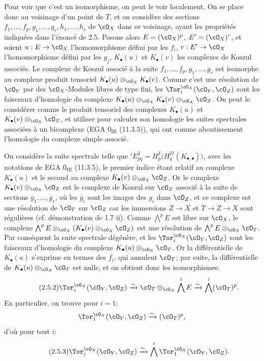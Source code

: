 Pour voir que c'est un isomorphisme, on peut le voir localement. On se place donc au voisinage d'un point de \(T\), et on considère des sections \(f_1,\ldots,f_p,g_1,\ldots,g_r,h_1,\ldots,h_s\) de \(\cO_X\) dans ce voisinage, ayant les propriétés indiquées dans l'énoncé de 2.5. Posons alors \(E=(\cO_X)^p\), \(E'=(\cO_X)^r\), et soient \(u:E\to\cO_X\) l'homomorphisme défini par les \(f_i\), \(v:E'\to\cO_X\) l'homomorphisme défini par les \(g_j\), \(K_\bullet(u)\) et \(K_\bullet(v)\) les
complexes de Koszul associés. Le complexe de Koszul associé à la suite \(f_1,\ldots,f_p,g_1,\ldots,g_r\) est isomorphe au complexe produit tensoriel \(K_\bullet(u)\otimes_{\cO_X}K_\bullet(v)\). Comme c'est une résolution de \(\cO_Y\) par des \(\cO_X\)-Modules libres de type fini, les \(\Tor_i^{\cO_X}(\cO_Y,\cO_Z)\) sont les faisceaux d'homologie du complexe \(K_\bullet(u)\otimes_{\cO_X}K_\bullet(v)\otimes_{\cO_X}\cO_Z\). On peut le considérer comme le produit tensoriel des complexes \(K_\bullet(u)\) et \(K_\bullet(v)\otimes_{\cO_X}\cO_Z\), et utiliser pour calculer son homologie les suites spectrales associées à un bicomplexe (EGA \(0_{\mathrm{III}}\) (11.3.5)), qui ont comme aboutissement l'homologie du complexe simple associé.

On considère la suite spectrale telle que \({}'E^2_{pq}=H^I_p\bigl(H^{II}_q(K_{\bullet,\bullet})\bigr)\), avec les notations de EGA \(0_{\mathrm{III}}\) (11.3.5), le premier indice étant relatif au complexe \(K_\bullet(u)\) et le second au complexe \(K_\bullet(v)\otimes_{\cO_X}\cO_Z\). Or le complexe \(K_\bullet(v)\otimes_{\cO_X}\cO_Z\) est le complexe de Koszul sur \(\cO_Z\) associé à la suite de sections \(\overline g_1,\ldots,\overline g_r\), où les \(\overline g_i\) sont les images des \(g_i\) dans \(\cO_Z\), et ce complexe est une résolution de \(\cO_T\) sur \(\cO_Z\) car les immersions \(Z\to X\) et \(T\to Z\to X\) sont régulières (cf. démonstration de 1.7 ii). Comme \(\bigwedge^p E\) est libre sur \(\cO_X\), le complexe \(\bigwedge^pE\otimes_{\cO_X}(K_\bullet(v)\otimes_{\cO_X}\cO_Z)\) est une résolution de \(\bigwedge^pE\otimes_{\cO_X}\cO_T\). Par conséquent la suite spectrale dégénère, et les \(\Tor_i^{\cO_X}(\cO_Y,\cO_Z)\) sont les faisceaux d'homologie du complexe \(K_\bullet(u)\otimes_{\cO_X}\cO_T\). Or la différentielle de \(K_\bullet(u)\) s'exprime en termes des \(f_i\), qui annulent \(\cO_T\); par suite, la différentielle de \(K_\bullet(u)\otimes_{\cO_X}\cO_T\) est nulle, et on obtient donc les isomorphismes:
\begin{equation}\tag{2.5.2}
\Tor_i^{\cO_X}(\cO_Y,\cO_Z)
\xrightarrow{\sim}
\cO_T\otimes_{\cO_X}\bigwedge^iE
\xrightarrow{\sim}
\bigwedge^i(\cO_T)^p.
\end{equation}
En particulier, on trouve pour \(i=1\):
\[
\Tor_1^{\cO_X}(\cO_Y,\cO_Z)\xrightarrow{\sim}(\cO_T)^p,
\]
d'où pour tout \(i\):
\begin{equation}\tag{2.5.3}
\Tor_i^{\cO_X}(\cO_Y,\cO_Z)
\xrightarrow{\sim}
\bigwedge^i\Tor_1^{\cO_X}(\cO_Y,\cO_Z).
\end{equation}

